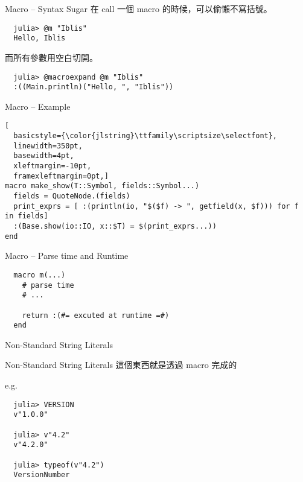 \documentclass[14pt]{beamer}
\begin{document}
\begin{frame}[fragile]{Macro -- Syntax Sugar}
  在 call 一個 macro 的時候，可以偷懶不寫括號。

\begin{lstlisting}
  julia> @m "Iblis"
  Hello, Iblis
\end{lstlisting}

  而所有參數用空白切開。

  \pause

\begin{lstlisting}
  julia> @macroexpand @m "Iblis"
  :((Main.println)("Hello, ", "Iblis"))
\end{lstlisting}
\end{frame}


\begin{frame}[fragile]{Macro -- Example}

\begin{lstlisting}[
  basicstyle={\color{jlstring}\ttfamily\scriptsize\selectfont},
  linewidth=350pt,
  basewidth=4pt,
  xleftmargin=-10pt,
  framexleftmargin=0pt,]
macro make_show(T::Symbol, fields::Symbol...)
  fields = QuoteNode.(fields)
  print_exprs = [ :(println(io, "$($f) -> ", getfield(x, $f))) for f in fields]
  :(Base.show(io::IO, x::$T) = $(print_exprs...))
end
\end{lstlisting}
\end{frame}


\begin{frame}[fragile]{Macro -- Parse time and Runtime}
\begin{lstlisting}
  macro m(...)
    # parse time
    # ...

    return :(#= excuted at runtime =#)
  end
\end{lstlisting}
\end{frame}


\begin{frame}[c]{}
  \centering
  \huge
  Non-Standard String Literals
\end{frame}


\begin{frame}[fragile]{Non-Standard String Literals}
  這個東西就是透過 macro 完成的

  e.g.

\begin{lstlisting}
  julia> VERSION
  v"1.0.0"

  julia> v"4.2"
  v"4.2.0"

  julia> typeof(v"4.2")
  VersionNumber
\end{lstlisting}
\end{frame}
\end{document}
